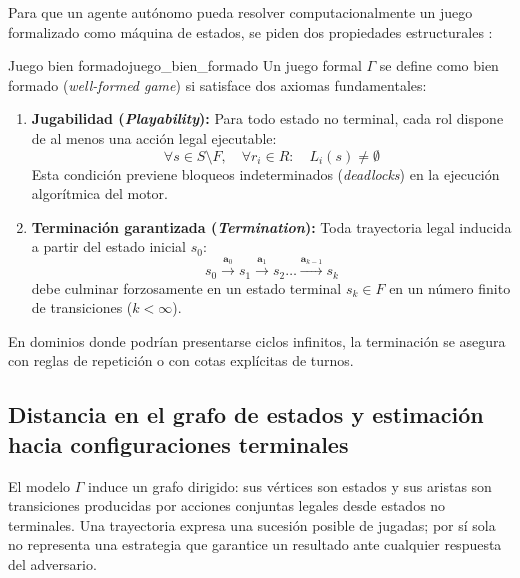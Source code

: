 Para que un agente autónomo pueda resolver computacionalmente un juego formalizado como máquina de estados, se piden dos propiedades estructurales \cite{Genesereth2005GGP, GeneserethThielscher2014}:

\begin{definicion}{Juego bien formado}{juego_bien_formado}
Un juego formal $\Gamma$ se define como bien formado (\textit{well-formed game}) \cite{Genesereth2005GGP, Love2008GDL, GeneserethThielscher2014} si satisface dos axiomas fundamentales:
\begin{enumerate}
    \item \textbf{Jugabilidad (\textit{Playability}):} Para todo estado no terminal, cada rol dispone de al menos una acción legal ejecutable:
    \begin{equation*}
        \forall s \in S \setminus F, \quad \forall r_i \in R : \quad L_i(s) \neq \emptyset
    \end{equation*}
    Esta condición previene bloqueos indeterminados (\textit{deadlocks}) en la ejecución algorítmica del motor.
    \item \textbf{Terminación garantizada (\textit{Termination}):} Toda trayectoria legal inducida a partir del estado inicial $s_0$:
    \begin{equation*}
        s_0 \xrightarrow{\mathbf{a}_0} s_1 \xrightarrow{\mathbf{a}_1} s_2 \dots \xrightarrow{\mathbf{a}_{k-1}} s_k
    \end{equation*}
    debe culminar forzosamente en un estado terminal $s_k \in F$ en un número finito de transiciones ($k < \infty$).
\end{enumerate}
\end{definicion}

En dominios donde podrían presentarse ciclos infinitos, la terminación se asegura con reglas de repetición o con cotas explícitas de turnos.

\subsection{Distancia en el grafo de estados y estimación hacia configuraciones terminales}

El modelo $\Gamma$ induce un grafo dirigido: sus vértices son estados y sus aristas son transiciones producidas por acciones conjuntas legales desde estados no terminales. Una trayectoria expresa una sucesión posible de jugadas; por sí sola no representa una estrategia que garantice un resultado ante cualquier respuesta del adversario.


